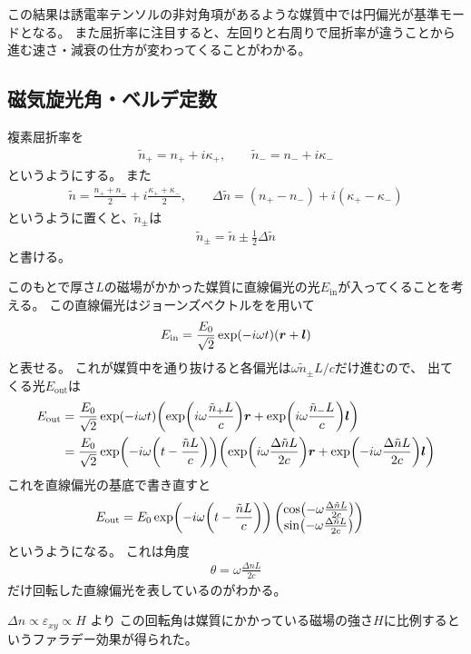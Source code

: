 \documentclass[9pt,dvipdfmx,a4paper]{jsarticle}
\begin{document}
この結果は誘電率テンソルの非対角項があるような媒質中では円偏光が基準モードとなる。
また屈折率に注目すると、左回りと右周りで屈折率が違うことから進む速さ・減衰の仕方が変わってくることがわかる。

\subsection{磁気旋光角・ベルデ定数}
複素屈折率を
\begin{align}
    \tilde{n}_{+} = n_+ +i\kappa_+,\qquad \tilde{n}_{-} = n_- +i\kappa_-
\end{align}
というようにする。
また
\begin{align}
    \tilde{n} = \frac{n_+ + n_-}{2} + i \frac{\kappa_+ + \kappa_-}{2} ,\qquad
    \Delta \tilde{n} = (n_+ -n_-) + i(\kappa_+ -\kappa_-)
\end{align}
というように置くと、\(\tilde{n}_{\pm}\)は
\begin{align}
    \tilde{n}_\pm = \tilde{n} \pm \frac{1}{2}\Delta\tilde{n}
\end{align}
と書ける。

このもとで厚さ\(L\)の磁場がかかった媒質に直線偏光の光\(E_{\text{in}}\)が入ってくることを考える。
この直線偏光はジョーンズベクトルをを用いて
\begin{align}
    E_{\text{in}} = \frac{E_0}{\sqrt{2}}\exp(-i\omega t)(\vb*{r}+\vb*{l})
\end{align}
と表せる。
これが媒質中を通り抜けると各偏光は\(\omega \tilde{n}_{\pm}L/c\)だけ進むので、
出てくる光\(E_{\text{out}}\)は
\begin{align}
    E_{\text{out}}
    &= \frac{E_0}{\sqrt{2}}\exp(-i\omega t) \qty(\exp(i\omega \frac{\tilde{n}_{+}L}{c})\vb*{r}
        +\exp(i\omega \frac{\tilde{n}_{-}L}{c})\vb*{l}) \notag\\
    &= \frac{E_0}{\sqrt{2}}\exp(-i\omega \qty(t-\frac{\tilde{n}L}{c}))
        \qty(\exp(i\omega \frac{\Delta\tilde{ n}L}{2c})\vb*{r}
            +\exp(-i\omega \frac{\Delta\tilde{n}L}{2c})\vb*{l})
\end{align}
これを直線偏光の基底で書き直すと
\begin{align}
    E_{\text{out}}
    &= E_0\exp(-i\omega \qty(t-\frac{\tilde{n}L}{c}))
    \begin{pmatrix}
       \cos(-\omega \frac{\Delta\tilde{n}L}{2c}) \\
       \sin(-\omega \frac{\Delta\tilde{n}L}{2c})
    \end{pmatrix}
\end{align}
というようになる。
これは角度
\begin{align*}
    \theta = \omega \frac{\Delta nL}{2c}
\end{align*}
だけ回転した直線偏光を表しているのがわかる。

\(\Delta n \propto \varepsilon_{xy} \propto H\) より
この回転角は媒質にかかっている磁場の強さ\(H\)に比例するというファラデー効果が得られた。
\end{document}
